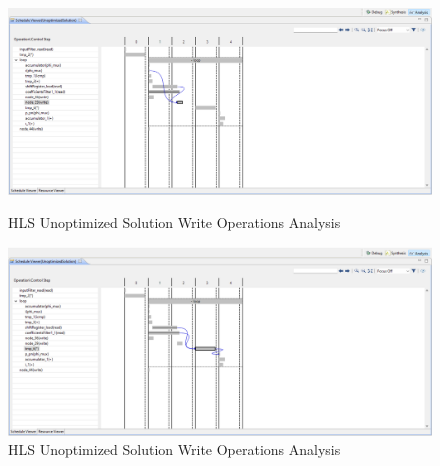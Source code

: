 \begin{figure}[H]
    \centering
    \begin{minipage}[b]{0.45\textwidth}
        \centering
        \includegraphics[width=\textwidth]{solutions/unoptimized/cyclesunoptimized5.png}
        \caption{HLS Unoptimized Solution Write Operations Analysis}
        \label{fig:left}
    \end{minipage}
    \hfill
    \begin{minipage}[b]{0.45\textwidth}
        \centering
        \includegraphics[width=\textwidth]{solutions/unoptimized/cyclesunoptimized6.png}
        \caption{HLS Unoptimized Solution Write Operations Analysis}
        \label{fig:right}
    \end{minipage}
\end{figure}

